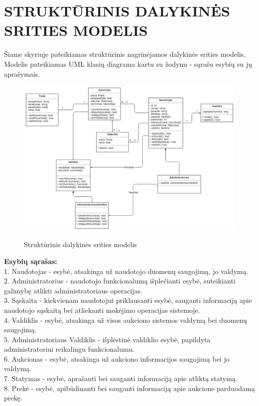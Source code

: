 \documentclass{VUMIFPSkursinis}
\begin{document}
	\section{STRUKTŪRINIS DALYKINĖS SRITIES MODELIS}
	Šiame skyriuje pateikiamas struktūrinis nagrinėjamos dalykinės srities modelis. Modelis pateikiamas UML klasių diagrama kartu su žodynu - sąrašu esybių su jų aprašymais.
	\begin{figure}[H]
		\centering
		\includegraphics[width=\linewidth]{img/umlClassDiagram.png}
		\label{fig:usecase}
		\caption{Struktūrinis dalykinės srities modelis}
	\end{figure}
	\noindent
	\textbf{Esybių sąrašas:} \\
	1. Naudotojas - esybė, atsakinga už naudotojo duomenų saugojimą, jo valdymą.\\
	2. Administratorius - naudotojo funkcionalumą išplečianti esybė, suteikianti galimybę atlikti administratoriaus operacijas.\\
	3. Sąskaita - kiekvienam naudotojui priklausanti esybė, sauganti informaciją apie naudotojo sąskaitą bei atliekanti mokėjimo operacijas sistemoje.\\
	4. Valdiklis - esybė, atsakinga už visos aukciono sistemos valdymą bei duomenų saugojimą.\\
	5. Administratoriaus Valdiklis - išplėstinė valdiklio esybė, papildyta administratoriui reikalingu funkcionalumu.\\
	6. Aukcionas - esybė, atsakinga už aukciono informacijos saugojimą bei jo valdymą.\\
	7. Statymas - esybė, aprašanti bei sauganti informaciją apie atliktą statymą.\\
	8. Prekė - esybė, apibūdinanti bei sauganti informaciją apie aukcione parduodamą prekę.\\
	
\end{document}
